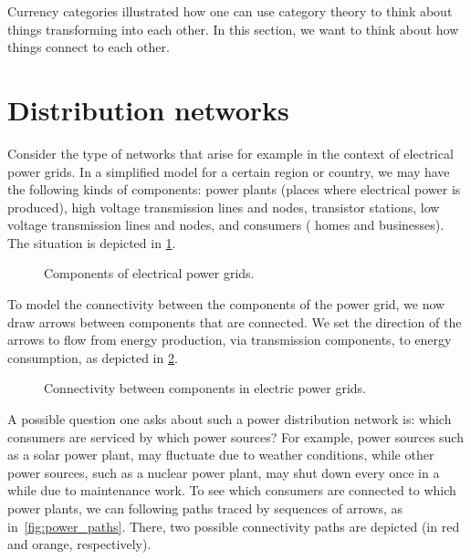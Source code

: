 
Currency categories illustrated how one can use category theory to think about things transforming into each other. In this section, we want to think about how things connect to each other.

\section{}

\section{Distribution networks}

Consider the type of networks that arise for example in the context of electrical power grids. In a simplified model for a certain region or country, we may have the following kinds of components: power plants (places where electrical power is produced), high voltage transmission lines and nodes, transistor stations, low voltage transmission lines and nodes, and consumers ( homes and businesses). The situation is depicted in \cref{fig:power_nodes}.

\begin{figure}[h!]
  \centering
  \caption{Components of electrical power grids.}
  \label{fig:power_nodes}
\end{figure}
To model the connectivity between the components of the power grid, we now draw arrows between components that are connected. We set the direction of the arrows to flow from energy production, via transmission components, to energy consumption, as depicted in \cref{fig:power_nodes_connected}.
\begin{figure}[h!]
  \centering
  \caption{Connectivity between components in electric power grids.}
  \label{fig:power_nodes_connected}
\end{figure}

A possible question one asks about such a power distribution network is: which consumers are serviced by which power sources? For example, power sources such as a solar power plant, may fluctuate due to weather conditions, while other power sources, such as a nuclear power plant, may shut down every once in a while due to maintenance work. To see which consumers are connected to which power plants, we can following paths traced by sequences of arrows, as in~\cref{fig:power_paths}. There, two possible connectivity paths are depicted (in red and orange, respectively).


